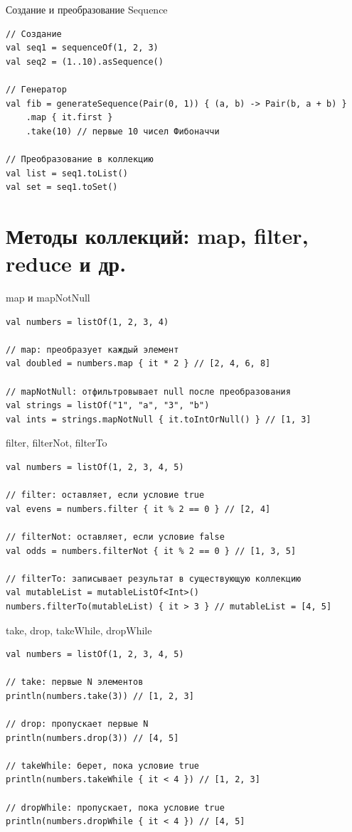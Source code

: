 \documentclass[aspectratio=169]{beamer}
\begin{document}
\begin{frame}[fragile]{Создание и преобразование Sequence}
\lstset{language=Kotlin}
\begin{lstlisting}
// Создание
val seq1 = sequenceOf(1, 2, 3)
val seq2 = (1..10).asSequence()

// Генератор
val fib = generateSequence(Pair(0, 1)) { (a, b) -> Pair(b, a + b) }
    .map { it.first }
    .take(10) // первые 10 чисел Фибоначчи

// Преобразование в коллекцию
val list = seq1.toList()
val set = seq1.toSet()
\end{lstlisting}
\end{frame}

\section{Методы коллекций: map, filter, reduce и др.}

\begin{frame}[fragile]{map и mapNotNull}
\lstset{language=Kotlin}
\begin{lstlisting}
val numbers = listOf(1, 2, 3, 4)

// map: преобразует каждый элемент
val doubled = numbers.map { it * 2 } // [2, 4, 6, 8]

// mapNotNull: отфильтровывает null после преобразования
val strings = listOf("1", "a", "3", "b")
val ints = strings.mapNotNull { it.toIntOrNull() } // [1, 3]
\end{lstlisting}
\end{frame}

\begin{frame}[fragile]{filter, filterNot, filterTo}
\lstset{language=Kotlin}
\begin{lstlisting}
val numbers = listOf(1, 2, 3, 4, 5)

// filter: оставляет, если условие true
val evens = numbers.filter { it % 2 == 0 } // [2, 4]

// filterNot: оставляет, если условие false
val odds = numbers.filterNot { it % 2 == 0 } // [1, 3, 5]

// filterTo: записывает результат в существующую коллекцию
val mutableList = mutableListOf<Int>()
numbers.filterTo(mutableList) { it > 3 } // mutableList = [4, 5]
\end{lstlisting}
\end{frame}

\begin{frame}[fragile]{take, drop, takeWhile, dropWhile}
\lstset{language=Kotlin}
\begin{lstlisting}
val numbers = listOf(1, 2, 3, 4, 5)

// take: первые N элементов
println(numbers.take(3)) // [1, 2, 3]

// drop: пропускает первые N
println(numbers.drop(3)) // [4, 5]

// takeWhile: берет, пока условие true
println(numbers.takeWhile { it < 4 }) // [1, 2, 3]

// dropWhile: пропускает, пока условие true
println(numbers.dropWhile { it < 4 }) // [4, 5]
\end{lstlisting}
\end{frame}
\end{document}

